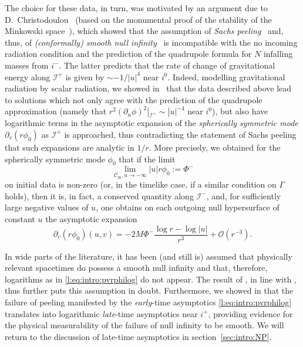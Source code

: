 \documentclass[11pt,english]{article}
\numberwithin{equation}{section}
\theoremstyle{remark}
\theoremstyle{plain}
\theoremstyle{remark}
\newcommand{\pu}{\partial_u}
\newcommand{\pv}{\partial_v}
\renewcommand{\(}{\left(}
\renewcommand{\)}{\right)}
\begin{document}
The choice for these data, in turn, was motivated by an argument due to D.\ Christodoulou~\cite{Chr02} (based on the monumental proof of the stability of the Minkowski space~\cite{CK93}), which showed that the assumption of \textit{Sachs peeling}~\cite{SeriesVI,SeriesVIII} and, thus, of \textit{(conformally) smooth null infinity}~\cite{Penrose65} is incompatible with the no incoming radiation condition and the prediction of the quadrupole formula for $N$ infalling masses from $i^-$. 
The latter predicts that the rate of change of gravitational energy along $\mathcal I^+$ is given by $\sim -1/|u|^4$ near $i^0$. 
Indeed, modelling gravitational radiation by scalar radiation, we showed in~\cite{I} that the data described above lead to solutions which not only agree with the prediction of the quadrupole approximation (namely that $r^2(\pu\phi)^2|_{\mathcal I^+}\sim |u|^{-4}$ near $i^0$), but also have logarithmic terms in the asymptotic expansion of the \textit{spherically symmetric mode} $\pv(r\phi_0)$ as $\mathcal{I}^+$ is approached, thus contradicting the statement of Sachs peeling that such expansions are analytic in $1/r$.
More precisely, we obtained for the spherically symmetric mode $\phi_0$ that if the limit
\begin{equation}
\lim_{\mathcal{C}_{\mathrm{in}},u\to-\infty}|u|r\phi_0:=\Phi^-
\end{equation}
on initial data is non-zero (or, in the timelike case, if a similar condition on $\Gamma$ holds), then it is, in fact, a conserved quantity along $\mathcal I^-$, and,  for sufficiently large negative values of $u$, one obtains on each outgoing null hypersurface of constant $u$ the asymptotic expansion
\begin{equation}\label{l:eq:intro:pvrphilog}
\pv(r\phi_0)(u,v)=-2M\Phi^- \frac{\log r-\log|u|}{r^3}+\mathcal{O}(r^{-3}).
\end{equation}

In wide parts of the literature, it has been (and still is) assumed that physically relevant spacetimes do possess a smooth null infinity and that, therefore, logarithms as in \eqref{l:eq:intro:pvrphilog} do not appear. 
The result of \cite{I}, in line with \cite{CK93}, thus further puts this assumption in doubt. 
Furthermore, we showed in \cite{II} that the failure of peeling manifested by the \emph{early}-time asymptotics \eqref{l:eq:intro:pvrphilog} translates into logarithmic \emph{late}-time asymptotics near $i^+$, providing evidence for the physical measurability of the failure of null infinity to be smooth. We will return to the discussion of late-time asymptotics in section~\ref{sec:intro:NP}.
\end{document}
